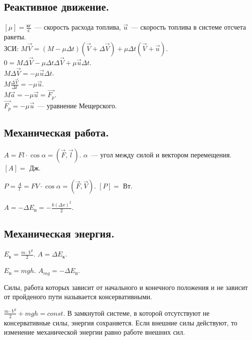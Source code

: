 \documentclass[12pt]{article}
\begin{document}
	\subsection{Реактивное движение.}
	$[\mu] = \frac{\text{кг}}{\text{с}}$~--- скорость расхода топлива, $\vec{u}$~--- скорость топлива в системе отсчета ракеты. \\
	ЗСИ: $M \vec{V} = (M - \mu \varDelta t)(\vec{V} + \varDelta \vec{V}) + \mu \varDelta t (\vec{V} + \vec{u})$. \\
	$0 = M \varDelta \vec{V} - \mu \varDelta t \varDelta \vec{V} + \mu \vec{u} \varDelta t$. \\
	$M \varDelta \vec{V} = -\mu \vec{u} \varDelta t$. \\
	$M \frac{\varDelta \vec{V}}{\varDelta t} = -\mu \vec{u}$. \\
	$M \vec{a} = - \mu \vec{u} = \vec{F_{p}}$. \\
	$\vec{F_{p}} = -\mu \vec{u}$~--- уравнение Мещерского.
	\subsection{Механическая работа.}
	\begin{definition}
		$A = Fl \cdot \cos \alpha = (\vec{F}, \vec{l})$. $\alpha$~--- угол между силой и вектором перемещения. $[A] =$ Дж.
	\end{definition}
	\begin{definition}[Мощность]
		$P = \frac{A}{t} = FV \cdot \cos \alpha = (\vec{F}, \vec{V})$. $[P] =$ Вт.
	\end{definition}
	\begin{definition}
		$A = -\varDelta E_{\text{п}} = -\frac{k (\varDelta x)^2}{2}$.
	\end{definition}
	\subsection{Механическая энергия.}
	\begin{definition}
		$E_{\text{к}} = \frac{m \cdot V^2}{2}$. $A = \varDelta E_{\text{к}}$.
	\end{definition}
	\begin{definition}
		$E_{\text{п}} = mgh$. $A_{mg} = - \varDelta E_{\text{п}}$.
	\end{definition}
	\begin{definition}
		Силы, работа которых зависит от начального и конечного положения и не зависит от пройденого пути называется консервативными.
	\end{definition}
	\begin{definition}
		$\frac{m \cdot V^2}{2} + mgh = const$. В замкнутой системе, в которой отсутствуют не консервативные силы, энергия сохраняется. Если внешние силы действуют, то изменение механической энергии равно работе внешних сил.
	\end{definition}
\end{document}
